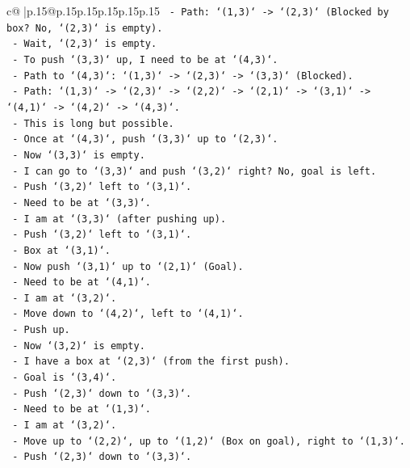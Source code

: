 \documentclass{article}
\begin{document}
{\begin{supertabular}{c@{$\;$}|p{.15\linewidth}@{}p{.15\linewidth}p{.15\linewidth}p{.15\linewidth}p{.15\linewidth}p{.15\linewidth}}
{{{\texttt{    {-} Path: `(1,3)` {-}> `(2,3)` (Blocked by box? No, `(2,3)` is empty).} \\
\texttt{    {-} Wait, `(2,3)` is empty.} \\
\texttt{    {-} To push `(3,3)` up, I need to be at `(4,3)`.} \\
\texttt{    {-} Path to `(4,3)`: `(1,3)` {-}> `(2,3)` {-}> `(3,3)` (Blocked).} \\
\texttt{    {-} Path: `(1,3)` {-}> `(2,3)` {-}> `(2,2)` {-}> `(2,1)` {-}> `(3,1)` {-}> `(4,1)` {-}> `(4,2)` {-}> `(4,3)`.} \\
\texttt{    {-} This is long but possible.} \\
\texttt{    {-} Once at `(4,3)`, push `(3,3)` up to `(2,3)`.} \\
\texttt{    {-} Now `(3,3)` is empty.} \\
\texttt{    {-} I can go to `(3,3)` and push `(3,2)` right? No, goal is left.} \\
\texttt{    {-} Push `(3,2)` left to `(3,1)`.} \\
\texttt{      {-} Need to be at `(3,3)`.} \\
\texttt{      {-} I am at `(3,3)` (after pushing up).} \\
\texttt{      {-} Push `(3,2)` left to `(3,1)`.} \\
\texttt{      {-} Box at `(3,1)`.} \\
\texttt{      {-} Now push `(3,1)` up to `(2,1)` (Goal).} \\
\texttt{        {-} Need to be at `(4,1)`.} \\
\texttt{        {-} I am at `(3,2)`.} \\
\texttt{        {-} Move down to `(4,2)`, left to `(4,1)`.} \\
\texttt{        {-} Push up.} \\
\texttt{      {-} Now `(3,2)` is empty.} \\
\texttt{      {-} I have a box at `(2,3)` (from the first push).} \\
\texttt{      {-} Goal is `(3,4)`.} \\
\texttt{      {-} Push `(2,3)` down to `(3,3)`.} \\
\texttt{        {-} Need to be at `(1,3)`.} \\
\texttt{        {-} I am at `(3,2)`.} \\
\texttt{        {-} Move up to `(2,2)`, up to `(1,2)` (Box on goal), right to `(1,3)`.} \\
\texttt{        {-} Push `(2,3)` down to `(3,3)`.} \\
}}}
\end{supertabular}}
\end{document}
